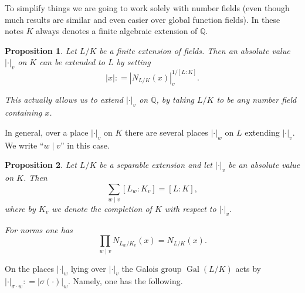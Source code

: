 \documentclass{article}
\newtheorem{proposition}{Proposition}[section]
\theoremstyle{definition}
\newtheorem{definition}[proposition]{Definition}
\DeclareMathOperator{\Gal}{Gal}
\newcommand{\term}{\textbf}
\newcommand{\dfn}{\mathrel{\mathop:}=}
\newcommand{\QQ}{\mathbb{Q}}
\begin{document}
To simplify things we are going to work solely with number fields (even though
much results are similar and even easier over global function fields). In these
notes $K$ always denotes a finite algebraic extension of $\QQ$.




\begin{proposition}
  Let $L/K$ be a finite extension of fields. Then an absolute value $|\cdot|_v$
  on $K$ can be extended to $L$ by setting
  $$|x| \dfn |N_{L/K} (x)|_v^{1/[L : K]}.$$

  This actually allows us to extend $|\cdot|_v$ on $\overline{\QQ}$, by taking
  $L/K$ to be any number field containing $x$.
\end{proposition}

In general, over a place $|\cdot|_v$ on $K$ there are several places $|\cdot|_w$
on $L$ extending $|\cdot|_v$. We write ``$w \mid v$'' in this case.

\begin{proposition}
  \label{proposition:product-of-local-norms}
  Let $L/K$ be a separable extension and let $|\cdot|_v$ be an absolute value on
  $K$. Then
  $$\sum_{w \mid v} [L_w : K_v] = [L : K],$$
  where by $K_v$ we denote the completion of $K$ with respect to $|\cdot|_v$.

  For norms one has
  $$\prod_{w\mid v} N_{L_w/K_v} (x) = N_{L/K} (x).$$
\end{proposition}

On the places $|\cdot|_w$ lying over $|\cdot|_v$ the Galois group $\Gal (L/K)$
acts by $|\cdot|_{\sigma\cdot w} \dfn |\sigma (\cdot)|_w$. Namely, one has the
following.
\end{document}
